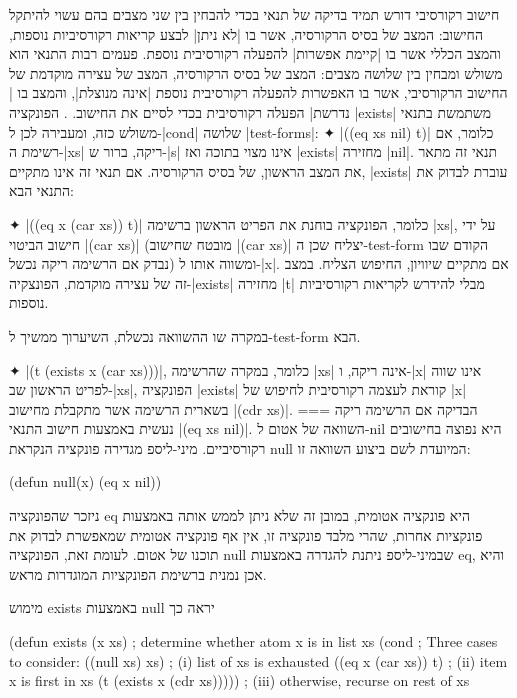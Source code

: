 חישוב רקורסיבי דורש תמיד בדיקה של תנאי בכדי להבחין בין שני מצבים בהם עשוי
להיתקל החישוב: המצב של בסיס הרקורסיה, אשר בו \ע|לא ניתן| לבצע קריאות רקורסיביות
נוספות, והמצב הכללי אשר בו \ע|קיימת אפשרות| להפעלה רקורסיבית נוספת. פעמים רבות
התנאי הוא משולש ומבחין בין שלושה מצבים: המצב של בסיס הרקורסיה, המצב של עצירה
מוקדמת של החישוב הרקורסיבי, אשר בו האפשרות להפעלה רקורסיבית נוספת \ע|אינה מנוצלת|,
והמצב בו \ע|נדרשת| הפעלה רקורסיבית בכדי לסיים את החישוב.
.
הפונקציה \T|exists| משתמשת בתנאי משולש כזה, ומעבירה לכן ל-\T|cond| שלושה
\E|test-forms|:
✦ \T|((eq xs nil) t)| כלומר, אם רשימת ה-\T|xs| ריקה, ברור ש-\T|s| אינו מצוי
בתוכה ואז \T|exists| מחזירה \T|nil|. תנאי זה מתאר את המצב הראשון, של בסיס
הרקורסיה. אם תנאי זה אינו מתקיים, \T|exists| עוברת לבדוק את התנאי הבא:

✦ \T|((eq x (car xs)) t)| כלומר, הפונקציה בוחנת את הפריט הראשון ברשימה \T|xs|,
על ידי חישוב הביטוי \T|(car xs)| (מובטח שחישוב \T|(car xs)| יצליח שכן
ה-test-form הקודם שבו נבדק אם הרשימה ריקה נכשל) ומשווה אותו ל-\T|x|. אם מתקיים
שיוויון, החיפוש הצליח. במצב זה של עצירה מוקדמת, הפונצקיה-\T|exists|
מחזירה \T|t| מבלי להידרש לקריאות רקורסיביות נוספות.

במקרה שו ההשוואה נכשלת, השיערוך ממשיך ל-test-form הבא.

✦ \T|(t (exists x (car xs)))|, כלומר, במקרה שהרשימה \T|xs| אינה ריקה, ו-\T|x|
אינו שווה לפריט הראשון שב-\T|xs|, הפונקציה \T|exists| קוראת לעצמה רקורסיבית
לחיפוש של \T|x| בשארית הרשימה אשר מתקבלת מחישוב \T|(cdr xs)|.
===
הבדיקה אם הרשימה ריקה נעשית באמצעות חישוב התנאי \T|(eq xs nil)|. השוואה של אטום
ל-nil היא נפוצה בחישובים רקורסיביים. מיני-ליספ מגדירה פונקציה הנקראת null
המיועדת לשם ביצוע השוואה זו:
\begin{LIBRARY}
(defun null(x) (eq x nil))
\end{LIBRARY}

ניזכר שהפונקציה eq היא פונקציה אטומית, במובן זה שלא ניתן לממש אותה באמצעות
פונקציות אחרות, שהרי מלבד פונקציה זו, אין אף פונקציה אטומית שמאפשרת לבדוק את
תוכנו של אטום. לעומת זאת, הפונקציה null שבמיני-ליספ ניתנת להגדרה
באמצעות eq, והיא אכן נמנית ברשימת הפונקציות המוגדרות מראש.

מימוש exists באמצעות null יראה כך
\begin{KERNEL}
(defun exists (x xs) ; determine whether atom x is in list xs
  (cond ; Three cases to consider:
    ((null xs) xs) ; (i) list of xs is exhausted
    ((eq x (car xs)) t) ; (ii) item x is first in xs
    (t (exists x (cdr xs))))) ; (iii) otherwise, recurse on rest of xs
\end{KERNEL}

